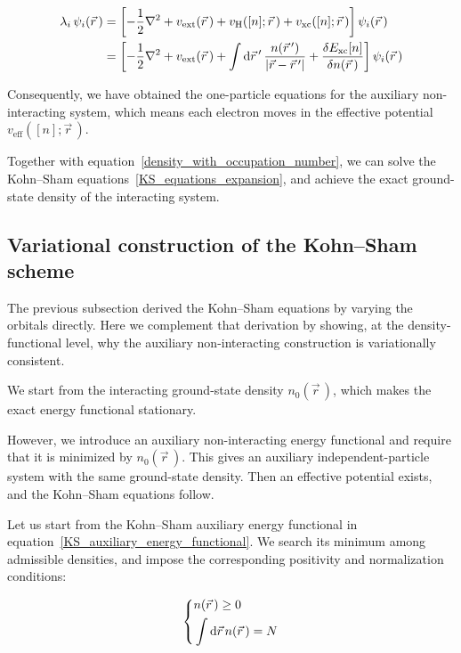 \begin{equation}
\begin{aligned}
    \lambda_i\,\psi_i(\vec{r}\,)
    &=\left[
    -\frac{1}{2}\nabla^2
    +v_\mathrm{ext}(\vec{r}\,)
    +v_\mathrm{H}([n];\vec{r}\,)
    +v_\mathrm{xc}([n];\vec{r}\,)
    \right]\psi_i(\vec{r}\,) \\
    &=\left[
    -\frac{1}{2}\nabla^2
    +v_\mathrm{ext}(\vec{r}\,)
    +\int\mathrm{d}{\vec{r}\,'}\,\frac{n(\vec{r}\,')}{|\vec{r}-\vec{r}\,'|}
    +\frac{\delta E_\mathrm{xc}[n]}{\delta n(\vec{r}\,)}
    \right]\psi_i(\vec{r}\,)
\end{aligned}
\label{KS_equations_expansion}
\end{equation}

Consequently, we have obtained the one-particle equations for the auxiliary non-interacting system,
which means each electron moves in the effective potential $v_\mathrm{eff}([n];\vec{r}\,)$.

Together with equation~\eqref{density_with_occupation_number},
we can solve the Kohn--Sham equations~\eqref{KS_equations_expansion},
and achieve the exact ground-state density of the interacting system.

\FloatBarrier
\subsection{Variational construction of the Kohn--Sham scheme}

The previous subsection derived the Kohn--Sham equations by varying the orbitals directly. Here we complement that derivation by showing, at the density-functional level, why the auxiliary non-interacting construction is variationally consistent.

We start from the interacting ground-state density $n_0(\vec{r}\,)$, which makes the exact energy functional stationary.

However, we introduce an auxiliary non-interacting energy functional and require that it is minimized by $n_0(\vec{r}\,)$.
This gives an auxiliary independent-particle system with the same ground-state density.
Then an effective potential exists, and the Kohn--Sham equations follow.

Let us start from the Kohn--Sham auxiliary energy functional in equation~\eqref{KS_auxiliary_energy_functional}.
We search its minimum among admissible densities,
and impose the corresponding positivity and normalization conditions:

\begin{equation}
\left\{
\begin{aligned}
    &n(\vec{r}\,) \ge 0 \\
    &\int\mathrm{d}{\vec{r}}\,n(\vec{r}\,) = N
\end{aligned}\right.
\label{admissible_density_conditions}
\end{equation}

